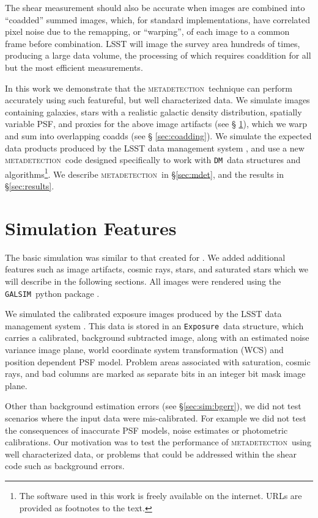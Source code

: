 \documentclass[twocolumn,twocolappendix,astrosym]{openjournal}
\newcommand{\galsim}{\texttt{GALSIM}}
\newcommand{\calexp}{\texttt{Exposure}}
\newcommand{\dmshort}{\texttt{DM}}
\newcommand{\dm}{\texttt{LSST DM}}
\newcommand{\mdet}{\textsc{metadetection}}
\begin{document}
The shear measurement should also be accurate when images are combined into
``coadded'' summed images, which, for standard implementations, have correlated
pixel noise due to the remapping, or ``warping'', of each image to a common
frame before combination.  LSST will image the survey area hundreds of times,
producing a large data volume, the processing of which requires coaddition for
all but the most efficient measurements.

In this work we demonstrate that the \mdet\ technique can perform accurately
using such featureful, but well characterized data.  We simulate images
containing galaxies, stars with a realistic galactic density distribution,
spatially variable PSF, and proxies for the above image artifacts (see \S
\ref{sec:sim}), which we warp and sum into overlapping coadds (see \S
\ref{sec:coadding}).  We simulate the expected data products produced by the
LSST data management system \citep[\dm,][]{JuricLSST2015,BoschHSC2017}, and use
a new \mdet\ code designed specifically to work with \dmshort\ data structures
and algorithms\footnote{The software used in this work is freely available on
the internet.  URLs are provided as footnotes to the text.}.  We describe
\mdet\ in \S \ref{sec:mdet}, and the results in \S \ref{sec:results}.
 
\section{Simulation Features} \label{sec:sim}

The basic simulation was similar to that created for \citep{mdet20}.  We added
additional features such as image artifacts, cosmic rays, stars, and saturated
stars which we will describe in the following sections.  All images were
rendered using the \galsim\ python package \citep{galsim2015}.

We simulated the calibrated exposure images produced by the LSST data
management system \citep[][\dm, version 0.2021.32]{JuricLSST2015,BoschHSC2017}.
This data is stored in an \calexp\ data structure, which carries a calibrated,
background subtracted image, along with an estimated noise variance image
plane, world coordinate system transformation (WCS) and position dependent PSF
model.  Problem areas associated with saturation, cosmic rays, and bad columns
are marked as separate bits in an integer bit mask image plane.

Other than background estimation errors (see \S \ref{sec:sim:bgerr}), we did not
test scenarios where the input data were mis-calibrated.  For example we did
not test the consequences of inaccurate PSF models, noise estimates or
photometric calibrations.  Our motivation was to test the performance of \mdet\
using well characterized data, or problems that could be addressed within
the shear code such as background errors.
\end{document}
